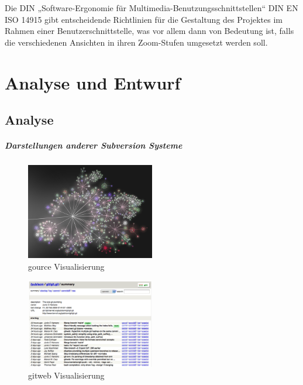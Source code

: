 \documentclass[color, ddc]{tudscrreprt}
\begin{document}
Die DIN „Software-Ergonomie für Multimedia-Benutzungsschnittstellen“ DIN EN ISO 14915 \cite{DIN:EN-ISO-14915-1} \cite{DIN:EN-ISO-14915-2} \cite{DIN:EN-ISO-14915-3} gibt entscheidende Richtlinien für die Gestaltung des Projektes im Rahmen einer Benutzerschnittstelle, was vor allem dann von Bedeutung ist, falls die verschiedenen Ansichten in ihren Zoom-Stufen umgesetzt werden soll.
    
\chapter{Analyse und Entwurf}

\section{Analyse}

\paragraph{Darstellungen anderer Subversion Systeme}
\begin{figure}[ht!]
\centering
\includegraphics[width=0.5\textwidth]{Skizzen/gource.jpg}
\caption{gource Visualisierung}
\end{figure}

\begin{figure}[ht!]
\centering
\includegraphics[width=0.5\textwidth]{Skizzen/gitweb.png}
\caption{gitweb Visualisierung}
\end{figure}
\end{document}
